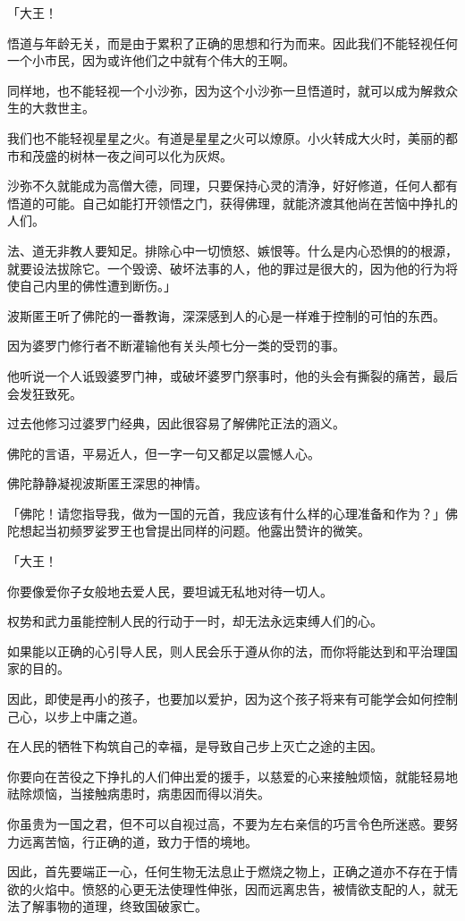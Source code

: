 \documentclass[twoside,openany]{book}
\begin{document}
「大王！

悟道与年龄无关，而是由于累积了正确的思想和行为而来。因此我们不能轻视任何一个小市民，因为或许他们之中就有个伟大的王啊。

同样地，也不能轻视一个小沙弥，因为这个小沙弥一旦悟道时，就可以成为解救众生的大救世主。

我们也不能轻视星星之火。有道是星星之火可以燎原。小火转成大火时，美丽的都市和茂盛的树林一夜之间可以化为灰烬。

沙弥不久就能成为高僧大德，同理，只要保持心灵的清浄，好好修道，任何人都有悟道的可能。自己如能打开领悟之门，获得佛理，就能济渡其他尚在苦恼中挣扎的人们。

法、道无非教人要知足。排除心中一切愤怒、嫉恨等。什么是内心恐惧的的根源，就要设法拔除它。一个毁谤、破坏法事的人，他的罪过是很大的，因为他的行为将使自己内里的佛性遭到断伤。」

波斯匿王听了佛陀的一番教诲，深深感到人的心是一样难于控制的可怕的东西。

因为婆罗门修行者不断灌输他有关头颅七分一类的受罚的事。

他听说一个人诋毁婆罗门神，或破坏婆罗门祭事时，他的头会有撕裂的痛苦，最后会发狂致死。

过去他修习过婆罗门经典，因此很容易了解佛陀正法的涵义。

佛陀的言语，平易近人，但一字一句又都足以震憾人心。

佛陀静静凝视波斯匿王深思的神情。

「佛陀！请您指导我，做为一国的元首，我应该有什么样的心理准备和作为？」佛陀想起当初频罗娑罗王也曾提出同样的问题。他露出赞许的微笑。

「大王！

你要像爱你子女般地去爱人民，要坦诚无私地对待一切人。

权势和武力虽能控制人民的行动于一时，却无法永远束缚人们的心。

如果能以正确的心引导人民，则人民会乐于遵从你的法，而你将能达到和平治理国家的目的。

因此，即使是再小的孩子，也要加以爱护，因为这个孩子将来有可能学会如何控制己心，以步上中庸之道。

在人民的牺牲下构筑自己的幸福，是导致自己步上灭亡之途的主因。

你要向在苦役之下挣扎的人们伸出爱的援手，以慈爱的心来接触烦恼，就能轻易地祛除烦恼，当接触病患时，病患因而得以消失。

你虽贵为一国之君，但不可以自视过高，不要为左右亲信的巧言令色所迷惑。要努力远离苦恼，行正确的道，致力于悟的境地。

因此，首先要端正一心，任何生物无法息止于燃烧之物上，正确之道亦不存在于情欲的火焰中。愤怒的心更无法使理性伸张，因而远离忠告，被情欲支配的人，就无法了解事物的道理，终致国破家亡。
\end{document}

